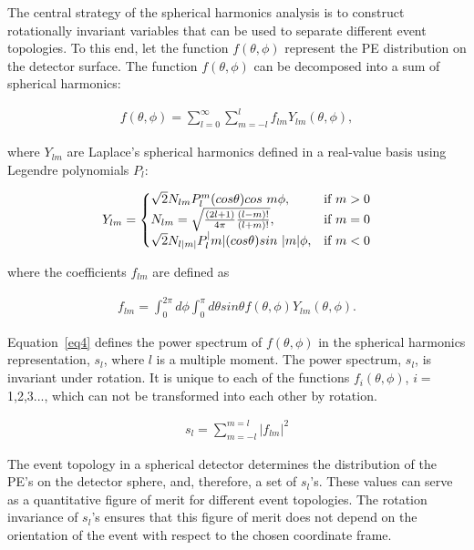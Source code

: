 The central strategy of the spherical harmonics analysis is to construct rotationally invariant variables that can be used to separate 
different event topologies. To this end, let the  function $f(\theta,\phi)$ represent the PE distribution on the detector surface. The function $f(\theta,\phi)$ can be decomposed into a sum of spherical harmonics:

\begin{eqnarray}
\label{eq1}
f(\theta,\phi) = \sum_{l=0}^{\infty} \sum_{m=-l}^{l} f_{lm} Y_{lm}(\theta,\phi),
\end{eqnarray}

where $Y_{lm}$ are Laplace's spherical harmonics defined in a real-value basis using Legendre polynomials $P_l$:

\begin{eqnarray}
\label{eq2}
Y_{lm} = \left\{
  \begin{array}{@{}ll@{}}
    \sqrt{2}N_{lm}P_l^m(cos\theta)cos~m\phi, & \text{if}\ m>0 \\
    N_{lm} = \sqrt{\frac{(2l+1)}{4\pi} \frac{(l-m)!}{(l+m)!}}, & \text{if}\ m=0 \\
    \sqrt{2}N_{l|m|}P_l^|m|(cos\theta)sin~|m|\phi, & \text{if}\ m<0
  \end{array}\right.
\end{eqnarray}

where the coefficients $f_{lm}$ are defined as
 
\begin{eqnarray}
\label{eq3}
f_{lm} = \int_{0}^{2\pi} d\phi \int_0^{\pi} d\theta sin\theta f(\theta,\phi) Y_{lm}(\theta,\phi).
\end{eqnarray}

Equation~\ref{eq4} defines the power spectrum of $f(\theta,\phi)$ in the spherical harmonics representation, $s_l$, where $l$ is a multiple moment. The power spectrum, $s_l$, is invariant under rotation. It is unique to each of the functions $f_i(\theta,\phi)$, $i=$1,2,3..., which can not be transformed into each other by rotation.

\begin{eqnarray}
\label{eq4}
s_l = \sum_{m=-l}^{m=l} |f_{lm}|^2
\end{eqnarray}

The event topology in a spherical detector determines the distribution of the PE's on the detector sphere, and, therefore, a set of $s_l$'s. These values can serve as a quantitative figure of merit for different event topologies. The rotation invariance of $s_l$'s ensures that this figure of merit does not depend on the orientation of the event with respect to the chosen coordinate frame.

